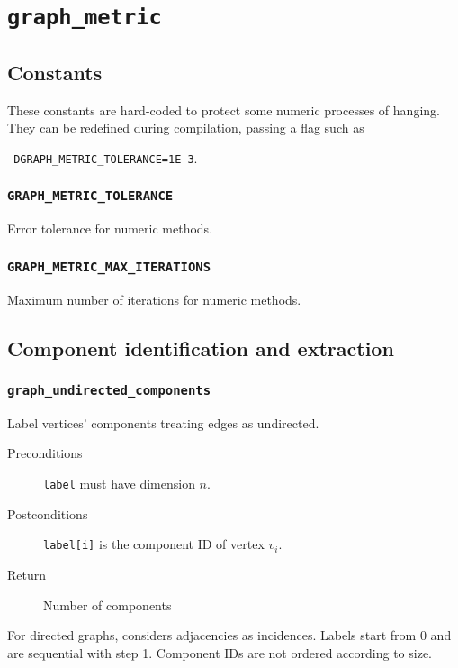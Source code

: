 \section{\texttt{graph\_metric}}

\subsection{Constants}

These constants are hard-coded to protect some numeric processes of hanging.
They can be redefined during compilation, passing a flag such as 

\texttt{-DGRAPH\_METRIC\_TOLERANCE=1E-3}.

\subsubsection{\texttt{GRAPH\_METRIC\_TOLERANCE}}

Error tolerance for numeric methods.

\subsubsection{\texttt{GRAPH\_METRIC\_MAX\_ITERATIONS}}

Maximum number of iterations for numeric methods.

\subsection{Component identification and extraction}

\subsubsection{\texttt{graph\_undirected\_components}}

Label vertices' components treating edges as undirected.

\begin{description}
 \item[Preconditions] \texttt{label} must have dimension $n$.
 \item[Postconditions] \texttt{label[i]} is the component ID of vertex $v_i$.
 \item[Return] Number of components
\end{description}

For directed graphs, considers adjacencies as incidences.
Labels start from 0 and are sequential with step 1.
Component IDs are not ordered according to size.

